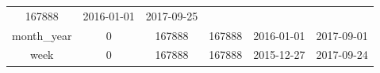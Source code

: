 \documentclass[]{book}
\theoremstyle{definition}
\theoremstyle{definition}
\theoremstyle{definition}
\theoremstyle{remark}
\begin{document}
\begin{longtable}[]{@{}cccccc@{}}
\begin{minipage}[t]{0.10\columnwidth}
167888\strut
\end{minipage} & \begin{minipage}[t]{0.15\columnwidth}\centering\strut
2016-01-01\strut
\end{minipage} & \begin{minipage}[t]{0.15\columnwidth}\centering\strut
2017-09-25\strut
\end{minipage}\tabularnewline
\begin{minipage}[t]{0.15\columnwidth}\centering\strut
month\_year\strut
\end{minipage} & \begin{minipage}[t]{0.12\columnwidth}\centering\strut
0\strut
\end{minipage} & \begin{minipage}[t]{0.13\columnwidth}\centering\strut
167888\strut
\end{minipage} & \begin{minipage}[t]{0.10\columnwidth}\centering\strut
167888\strut
\end{minipage} & \begin{minipage}[t]{0.15\columnwidth}\centering\strut
2016-01-01\strut
\end{minipage} & \begin{minipage}[t]{0.15\columnwidth}\centering\strut
2017-09-01\strut
\end{minipage}\tabularnewline
\begin{minipage}[t]{0.15\columnwidth}\centering\strut
week\strut
\end{minipage} & \begin{minipage}[t]{0.12\columnwidth}\centering\strut
0\strut
\end{minipage} & \begin{minipage}[t]{0.13\columnwidth}\centering\strut
167888\strut
\end{minipage} & \begin{minipage}[t]{0.10\columnwidth}\centering\strut
167888\strut
\end{minipage} & \begin{minipage}[t]{0.15\columnwidth}\centering\strut
2015-12-27\strut
\end{minipage} & \begin{minipage}[t]{0.15\columnwidth}\centering\strut
2017-09-24\strut
\end{minipage}\tabularnewline
\bottomrule
\end{longtable}
\end{document}
